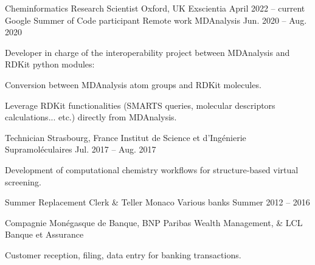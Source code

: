 \begin{minipage}[t]{.02\linewidth}
    \cvsubsection{}
\end{minipage}
% 
\begin{minipage}[t]{.49\linewidth}
% 
    \begin{cventries}
% 
        \cventryvar
            {Cheminformatics Research Scientist}
            {Oxford, UK}
            {Exscientia}
            {April 2022 -- current}
            {}
%
        \cventryvar
            {Google Summer of Code participant}
            {Remote work}
            {MDAnalysis}
            {Jun. 2020 -- Aug. 2020}
            {
            \vspace{-1.2\baselineskip}
            Developer in charge of the interoperability project between MDAnalysis and RDKit python modules: \vspace{1.2\baselineskip}
            \begin{cvitems}
                \item{Conversion between MDAnalysis atom groups and RDKit molecules.}
                \item{Leverage RDKit functionalities (SMARTS queries, molecular descriptors calculations... etc.) directly from MDAnalysis.}
            \end{cvitems}
            \vspace{1em}
            }
% 
        \cventryvar
            {Technician}
            {Strasbourg, France}
            {Institut de Science et d'Ingénierie Supramoléculaires}
            {Jul. 2017 -- Aug. 2017}
            {
            \begin{cvitems}
                \item{Development of computational chemistry workflows for structure-based virtual screening.}
            \end{cvitems}
            \vspace{1em}
            }
% 
        \cventryvar
            {Summer Replacement Clerk \& Teller}
            {Monaco}
            {Various banks}
            {Summer 2012 -- 2016}
            {
            \begin{cvitems}
                \item{Compagnie Monégasque de Banque, BNP Paribas Wealth \mbox{Management}, \& LCL Banque et Assurance}
                \item{Customer reception, filing, data entry for banking transactions.}
            \end{cvitems}
            \vspace{1em}
            }
% 
    \end{cventries}
% 
\end{minipage}